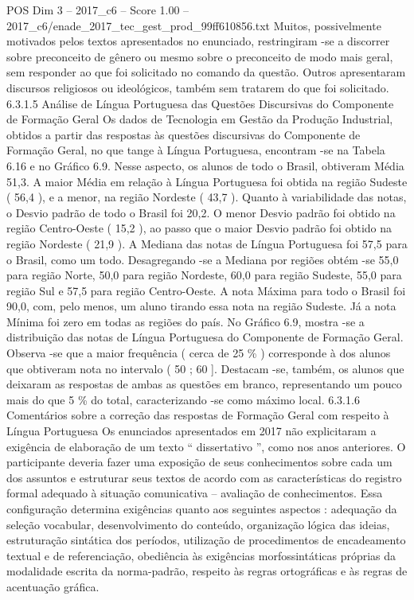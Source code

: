 \begin{textsample}{POS Dim 3 – 2017\_c6 – Score 1.00 – 2017\_c6/enade\_2017\_tec\_gest\_prod\_99ff610856.txt}
Muitos, possivelmente motivados pelos textos apresentados no enunciado, restringiram -se a discorrer sobre preconceito de gênero ou mesmo sobre o preconceito de modo mais geral, sem responder ao que foi solicitado no comando da questão.
Outros apresentaram discursos religiosos ou ideológicos, também sem tratarem do que foi solicitado. 6.3.1.5 Análise de Língua Portuguesa das Questões Discursivas do Componente de Formação Geral Os dados de Tecnologia em Gestão da Produção Industrial, obtidos a partir das respostas às questões discursivas do Componente de Formação Geral, no que tange à Língua Portuguesa, encontram -se na Tabela 6.16 e no Gráfico 6.9.
Nesse aspecto, os alunos de todo o Brasil, obtiveram Média 51,3.
A maior Média em relação à Língua Portuguesa foi obtida na região Sudeste ( 56,4 ), e a menor, na região Nordeste ( 43,7 ).
Quanto à variabilidade das notas, o Desvio padrão de todo o Brasil foi 20,2.
O menor Desvio padrão foi obtido na região Centro-Oeste ( 15,2 ), ao passo que o maior Desvio padrão foi obtido na região Nordeste ( 21,9 ).
A Mediana das notas de Língua Portuguesa foi 57,5 para o Brasil, como um todo.
Desagregando -se a Mediana por regiões obtém -se 55,0 para região Norte, 50,0 para região Nordeste, 60,0 para região Sudeste, 55,0 para região Sul e 57,5 para região Centro-Oeste.
A nota Máxima para todo o Brasil foi 90,0, com, pelo menos, um aluno tirando essa nota na região Sudeste.
Já a nota Mínima foi zero em todas as regiões do país.
No Gráfico 6.9, mostra -se a distribuição das notas de Língua Portuguesa do Componente de Formação Geral.
Observa -se que a maior frequência ( cerca de 25 \% ) corresponde à dos alunos que obtiveram nota no intervalo ( 50 ; 60 ].
Destacam -se, também, os alunos que deixaram as respostas de ambas as questões em branco, representando um pouco mais do que 5 \% do total, caracterizando -se como máximo local. 6.3.1.6 Comentários sobre a correção das respostas de Formação Geral com respeito à Língua Portuguesa Os enunciados apresentados em 2017 não explicitaram a exigência de elaboração de um texto “ dissertativo ”, como nos anos anteriores.
O participante deveria fazer uma exposição de seus conhecimentos sobre cada um dos assuntos e estruturar seus textos de acordo com as características do registro formal adequado à situação comunicativa – avaliação de conhecimentos.
Essa configuração determina exigências quanto aos seguintes aspectos : adequação da seleção vocabular, desenvolvimento do conteúdo, organização lógica das ideias, estruturação sintática dos períodos, utilização de procedimentos de encadeamento textual e de referenciação, obediência às exigências morfossintáticas próprias da modalidade escrita da norma-padrão, respeito às regras ortográficas e às regras de acentuação gráfica.

\end{textsample}
